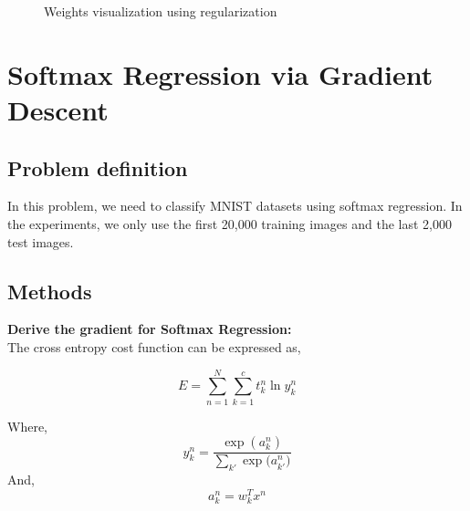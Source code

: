 \documentclass{article} %
\begin{document}
\begin{figure}
	\qquad
	\caption{Weights visualization using regularization}%
	\label{fig:P10}%
\end{figure}

\newpage
\section{Softmax Regression via Gradient Descent}
\subsection{Problem definition}
In this problem, we need to classify MNIST datasets using softmax regression. In the experiments, we only use the first 20,000 training images and the last 2,000 test images.

\subsection{Methods}
\textbf{Derive the gradient for Softmax Regression:} \\
The cross entropy cost function can be expressed as,

\begin{equation}
	E = \sum_{n=1}^{N}\sum_{k=1}^{c}t_k^n\ln y_k^n
\end{equation}

Where, 
\begin{equation}
	y_k^n = \frac{\exp{(a_k^n)}}{ \sum_{k'}\exp{(a_{k'}^n})}
\end{equation}
And, 
\begin{equation}
	a_k^n = w_k^Tx^n
\end{equation}
\end{document}
